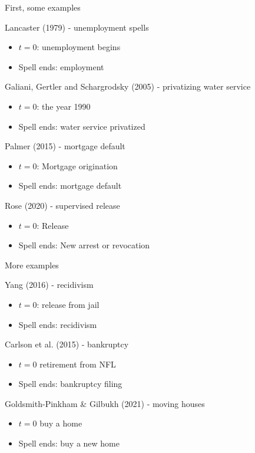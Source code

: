 \documentclass[notes,11pt, aspectratio=169]{beamer}
\newenvironment{wideitemize}{\itemize\addtolength{\itemsep}{10pt}}{\enditemize}
\begin{document}
\begin{frame}{First, some examples}
  \begin{wideitemize}
  \item Lancaster (1979) - unemployment spells
    \begin{itemize}
    \item $t=0$: unemployment begins
    \item Spell ends: employment
    \end{itemize}
  \item Galiani, Gertler and Schargrodsky (2005) - privatizing water service 
    \begin{itemize}
    \item $t=0$: the year 1990
    \item Spell ends: water service privatized      
    \end{itemize}
  \item Palmer (2015) - mortgage default
    \begin{itemize}
    \item $t = 0$: Mortgage origination
    \item Spell ends: mortgage default
    \end{itemize}
  \item Rose (2020) - supervised release
    \begin{itemize}
    \item $t = 0$: Release 
    \item Spell ends:  New arrest or revocation
    \end{itemize}
  \end{wideitemize}
\end{frame}


\begin{frame}{More examples}
  \begin{wideitemize}
  \item Yang (2016) - recidivism
    \begin{itemize}
    \item $t=0$: release from jail
    \item Spell ends: recidivism
    \end{itemize}
  \item Carlson et al. (2015) - bankruptcy
    \begin{itemize}
    \item $t = 0$ retirement from NFL
    \item Spell ends: bankruptcy filing
    \end{itemize}
  \item Goldsmith-Pinkham \& Gilbukh (2021) - moving houses
    \begin{itemize}
    \item $t = 0$ buy a home
    \item Spell ends: buy a new home
    \end{itemize}
  \end{wideitemize}
\end{frame}
\end{document}
